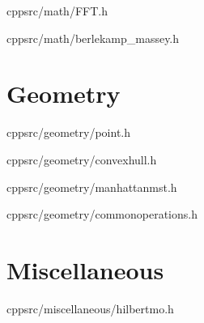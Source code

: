 \documentclass[portrait, 8pt, a4paper, oneside, twocolumn]{extarticle}
\begin{document}
    {}
    {}
    {cpp}{src/math/FFT.h}
    \noindent\hrulefill
    
    {}
    {}
    {cpp}{src/math/berlekamp_massey.h}
    \noindent\hrulefill

\section{Geometry}

    {}
    {}
    {cpp}{src/geometry/point.h}
    \noindent\hrulefill

    {}
    {}
    {cpp}{src/geometry/convexhull.h}
    \noindent\hrulefill

    {}
    {}
    {cpp}{src/geometry/manhattanmst.h}
    \noindent\hrulefill

    {}
    {}
    {cpp}{src/geometry/commonoperations.h}
    \noindent\hrulefill

\section{Miscellaneous}

    {}
    {}
    {cpp}{src/miscellaneous/hilbertmo.h}
    \noindent\hrulefill




\end{document}
